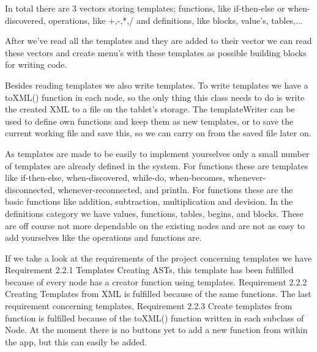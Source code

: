 \documentclass[a4paper,12pt]{report}
\begin{document}
In total there are 3 vectors storing templates; functions, like if-then-else or when-discovered, operations, like +,-,*,/ and definitions, like blocks, value's, tables,...

After we've read all the templates and they are added to their vector we can read these vectors and create menu's with these templates as possible building blocks for writing code.

Besides reading templates we also write templates. To write templates we have a toXML() function in each node, so the only thing this class needs to do is write the created XML to a file on the tablet's storage. The templateWriter
can be used to define own functions and keep them as new templates, or to save the current working file and save this, so we can carry on from the saved file later on.

As templates are made to be easily to implement yourselves only a small number of templates are already defined in the system. For functions these are templates like if-then-else, when-discovered, while-do, when-becomes,
whenever-disconnected, whenever-reconnected, and println. For functions these are the basic functions like addition, subtraction, multiplication and devision. In the definitions category we have values, functions, tables, begins,
and blocks. These are off course not more dependable on the existing nodes and are not as easy to add yourselves like the operations and functions are.

If we take a look at the requirements of the project concerning templates we have Requirement 2.2.1 Templates Creating ASTs, this template has been fulfilled because of every node has a creator function using templates.
Requirement 2.2.2 Creating Templates from XML is fulfilled because of the same functions. The last requirement concerning templates, Requirement 2.2.3 Create templates from function is fulfilled because of the toXML() function
written in each subclass of Node. At the moment there is no buttons yet to add a new function from within the app, but this can easily be added.
\end{document}
